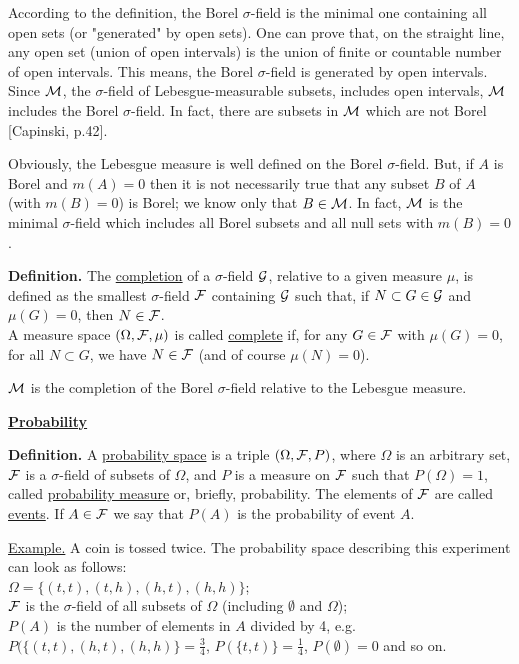 \documentclass[a4paper,10pt]{article}
\newcommand{\1}[1]{\mathbf{1}_{\{#1\}}}
\begin{document}
According to the definition, the Borel $\sigma$-field is the minimal one containing all open sets (or "generated" by open sets). One can prove that, on the straight line, any open set (union of open intervals) is the union of finite or countable number of open intervals. This means, the Borel $\sigma$-field is generated by open intervals. Since $\cal M$, the $\sigma$-field of Lebesgue-measurable subsets, includes open intervals, $\cal M$ includes the Borel $\sigma$-field. In fact, there are subsets in $\cal M$ which are not Borel [Capinski, p.42].

Obviously, the Lebesgue measure is well defined on the Borel $\sigma$-field. But, if $A$ is Borel and $m(A)=0$ then it is not necessarily true that any subset $B$ of $A$ (with $m(B)=0$) is Borel; we know only that $B\in{\cal M}$. In fact, $\cal M$ is the minimal $\sigma$-field which includes all Borel subsets and all null sets with $m(B)=0$.\vspace{3mm}

{\bf Definition.} The \underline{completion} of a $\sigma$-field $\cal G$, relative to a given measure $\mu$, is defined as the smallest $\sigma$-field $\cal F$ containing $\cal G$ such that, if $N\subset G\in{\cal G}$ and $\mu(G)=0$, then $N\in{\cal F}$.\\
A measure space $(\Omega,{\cal F},\mu)$ is called \underline{complete} if, for any $G\in{\cal F}$ with $\mu(G)=0$, for all $N\subset G$, we have $N\in{\cal F}$ (and of course $\mu(N)=0$).
\vspace{3mm}

$\cal M$ is the completion of the Borel $\sigma$-field relative to the Lebesgue measure.\newpage

\begin{center}\bf\underline{Probability} \end{center}\vspace{3mm}

{\bf Definition.} A \underline{probability space} is a triple $(\Omega,{\cal F}, P)$, where $\Omega$ is an arbitrary set, $\cal F$ is a $\sigma$-field of subsets of $\Omega$, and $P$ is a measure on $\cal F$ such that $P(\Omega)=1$, called \underline{probability measure} or, briefly, probability. The elements of $\cal F$ are called \underline{events}. If $A\in{\cal F}$ we say that $P(A)$ is the probability of event $A$.\vspace{3mm}

\underline{Example.} A coin is tossed twice. The probability space describing this experiment can look as follows:\\
$\Omega=\{(t,t),(t,h),(h,t),(h,h)\}$;\\
$\cal F$ is the $\sigma$-field of all subsets of $\Omega$ (including $\emptyset$ and $\Omega$);\\
$P(A)$ is the number of elements in $A$ divided by 4, e.g. $P(\{(t,t),(h,t),(h,h)\}=\frac{3}{4}$, $P(\{t,t)\}=\frac{1}{4}$, $P(\emptyset)=0$ and so on.\vspace{3mm}
\end{document}
